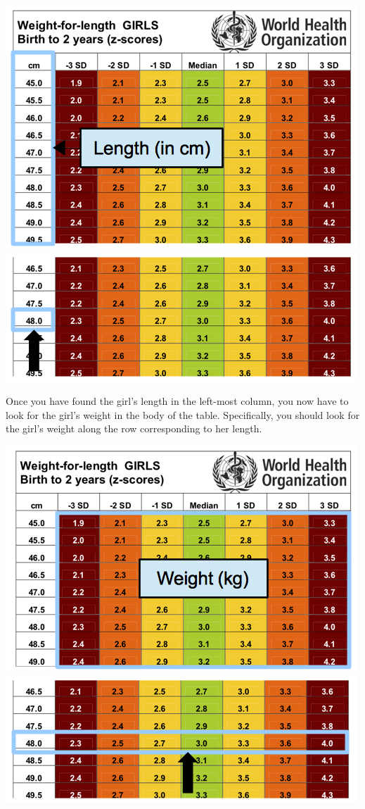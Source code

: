 \documentclass[12pt,]{book}
\theoremstyle{definition}
\theoremstyle{definition}
\theoremstyle{definition}
\theoremstyle{remark}
\begin{document}
\includegraphics{images/whzRefTable01.png}
\includegraphics{images/whzRefTable01a.png}

Once you have found the girl's length in the left-most column, you now
have to look for the girl's weight in the body of the table.
Specifically, you should look for the girl's weight along the row
corresponding to her length.

\includegraphics{images/whzRefTable03.png}
\includegraphics{images/whzRefTable03a.png}
\end{document}
